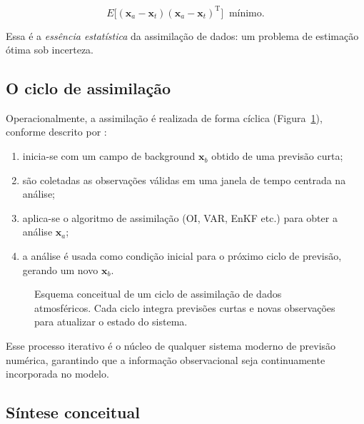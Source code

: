 \begin{equation}
E\big[(\mathbf{x}_a - \mathbf{x}_t)(\mathbf{x}_a - \mathbf{x}_t)^{\mathrm{T}}\big] 
\;\; \text{mínimo.}
\end{equation}

Essa é a \textit{essência estatística} da assimilação de dados: um problema de estimação ótima sob incerteza.

\subsection*{O ciclo de assimilação}

Operacionalmente, a assimilação é realizada de forma cíclica (Figura~\ref{fig:cycle}), conforme descrito por \citet{Kalnay2003}:
\begin{enumerate}
    \item inicia-se com um campo de background \( \mathbf{x}_b \) obtido de uma previsão curta;
    \item são coletadas as observações válidas em uma janela de tempo centrada na análise;
    \item aplica-se o algoritmo de assimilação (OI, VAR, EnKF etc.) para obter a análise \( \mathbf{x}_a \);
    \item a análise é usada como condição inicial para o próximo ciclo de previsão, gerando um novo \( \mathbf{x}_b \).
\end{enumerate}

\begin{figure}[h!]
\centering

\caption{Esquema conceitual de um ciclo de assimilação de dados atmosféricos. Cada ciclo integra previsões curtas e novas observações para atualizar o estado do sistema.}
\label{fig:cycle}
\end{figure}

Esse processo iterativo é o núcleo de qualquer sistema moderno de previsão numérica, garantindo que a informação observacional seja continuamente incorporada no modelo.

\subsection*{Síntese conceitual}

